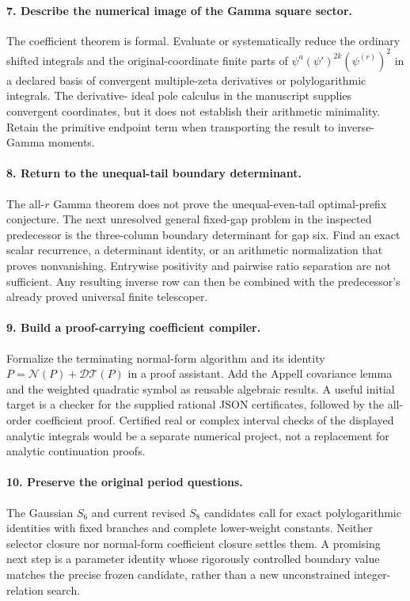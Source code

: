 \documentclass[11pt,letterpaper]{article}
\numberwithin{equation}{section}
\theoremstyle{definition}\newtheorem{definition}[theorem]{Definition}
\theoremstyle{remark}\newtheorem{remark}[theorem]{Remark}
\newcommand{\D}{\mathcal D}\newcommand{\NF}{\mathcal N}\newcommand{\Prim}{\mathcal T}
\begin{document}
\paragraph{7. Describe the numerical image of the Gamma square sector.}
The coefficient theorem is formal. Evaluate or systematically reduce
the ordinary shifted integrals and the original-coordinate finite parts
of $\psi^a(\psi')^{2k}(\psi^{(r)})^2$ in a declared basis of convergent
multiple-zeta derivatives or polylogarithmic integrals. The derivative-
ideal pole calculus in the manuscript supplies convergent coordinates,
but it does not establish their arithmetic minimality. Retain the
primitive endpoint term when transporting the result to inverse-Gamma
moments.

\paragraph{8. Return to the unequal-tail boundary determinant.}
The all-$r$ Gamma theorem does not prove the unequal-even-tail
optimal-prefix conjecture. The next unresolved general fixed-gap
problem in the inspected predecessor is the three-column boundary
determinant for gap six. Find an exact scalar recurrence, a determinant
identity, or an arithmetic normalization that proves nonvanishing.
Entrywise positivity and pairwise ratio separation are not sufficient.
Any resulting inverse row can then be combined with the predecessor's
already proved universal finite telescoper.

\paragraph{9. Build a proof-carrying coefficient compiler.}
Formalize the terminating normal-form algorithm and its identity
$P=\NF(P)+\D\Prim(P)$ in a proof assistant. Add the Appell covariance
lemma and the weighted quadratic symbol as reusable algebraic results.
A useful initial target is a checker for the supplied rational JSON
certificates, followed by the all-order coefficient proof. Certified
real or complex interval checks of the displayed analytic integrals
would be a separate numerical project, not a replacement for analytic
continuation proofs.

\paragraph{10. Preserve the original period questions.}
The Gaussian $S_6$ and current revised $S_8$ candidates call for exact
polylogarithmic identities with fixed branches and complete lower-weight
constants. Neither selector closure nor normal-form coefficient
closure settles them. A promising next step is a parameter identity
whose rigorously controlled boundary value matches the precise frozen
candidate, rather than a new unconstrained integer-relation search.
\end{document}
